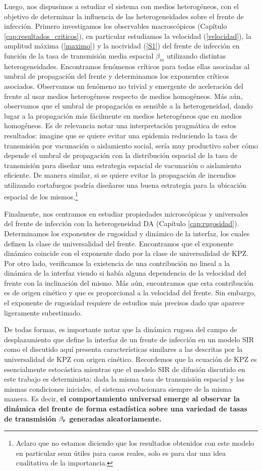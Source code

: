 Luego, nos dispusimos a estudiar el sistema con medios heterogéneos, con el objetivo de determinar la influencia de las heterogeneidades sobre el frente de infección. Primero investigamos los observables macroscópicos (Capítulo \ref{cap:resultados_criticos}), en particular estudiamos la velocidad (\ref{velocidad}), la amplitud máxima (\ref{maximo}) y la nocividad (\ref{S1}) del frente de infección en función de la tasa de transmisión media espacial $\beta_m$ utilizando distintas heterogeneidades. Encontramos fenómenos críticos para todas ellas asociadas al umbral de propagación del frente y determinamos los exponentes críticos asociados. Observamos un fenómeno no trivial y emergente de aceleración del frente al usar medios heterogéneos respecto de medios homogéneos. Más aún, observamos que el umbral de propagación es sensible a la heterogeneidad, dando lugar a la propagación más fácilmente en medios heterogéneos que en medios homogéneos. Es de relevancia notar una interpretación pragmática de estos resultados: imagine que se quiere evitar una epidemia reduciendo la tasa de transmisión por vacunación o aislamiento social, sería muy productivo saber cómo depende el umbral de propagación con la distribución espacial de la tasa de transmisión para diseñar una estrategia espacial de vacunación o aislamiento eficiente. De manera similar, si se quiere evitar la propagación de incendios utilizando cortafuegos podría diseñarse una buena estrategia para la ubicación espacial de los mismos.\footnote{Aclaro que no estamos diciendo que los resultados obtenidos con este modelo en particular sean útiles para casos reales, solo es para dar una idea cualitativa de la importancia.}

Finalmente, nos centramos en estudiar propiedades microscópicas y universales del frente de infección con la heterogeneidad DA (Capítulo \ref{cap:rugosidad}). Determinamos los exponentes de rugosidad y dinámico de la interfaz, los cuales definen la clase de universalidad del frente. Encontramos que el exponente dinámico coincide con el exponente dado por la clase de universalidad de KPZ. Por otro lado, verificamos la existencia de una contribución no lineal a la dinámica de la interfaz viendo si había alguna dependencia de la velocidad del frente con la inclinación del mismo. Más aún, encontramos que esta contribución es de origen cinético y que es proporcional a la velocidad del frente. Sin embargo, el exponente de rugosidad requiere de estudios más precisos dado que aparece ligeramente subestimado.

De todas formas, es importante notar que la dinámica rugosa del campo de desplazamiento que define la interfaz de un frente de infección en un modelo SIR como el discutido aquí presenta características similares a las descritas por la universalidad de KPZ con origen cinético. Recordemos que la ecuación de KPZ es esencialmente estocástica mientras que el modelo SIR de difusión discutido en este trabajo es determinista: dada la misma tasa de transmisión espacial y las mismas condiciones iniciales, el sistema evolucionara siempre de la misma manera. Es decir, \textbf{el comportamiento universal emerge al observar la dinámica del frente de forma estadística sobre una variedad de tasas de transmisión $\beta_{\vb{r}}$ generadas aleatoriamente.}

